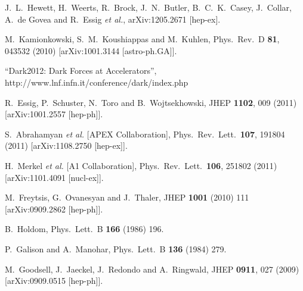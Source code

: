   J.~L.~Hewett, H.~Weerts, R.~Brock, J.~N.~Butler, B.~C.~K.~Casey, J.~Collar, A.~de Govea and R.~Essig {\it et al.}, arXiv:1205.2671 [hep-ex].
  

  M.~Kamionkowski, S.~M.~Koushiappas and M.~Kuhlen,
  Phys.\ Rev.\ D {\bf 81}, 043532 (2010)
  [arXiv:1001.3144 [astro-ph.GA]].

  ``Dark2012: Dark Forces at Accelerators'', http://www.lnf.infn.it/conference/dark/index.php


  R.~Essig, P.~Schuster, N.~Toro and B.~Wojtsekhowski,
  JHEP {\bf 1102}, 009 (2011)
  [arXiv:1001.2557 [hep-ph]].

  S.~Abrahamyan {\it et al.}  [APEX Collaboration],
  Phys.\ Rev.\ Lett.\  {\bf 107}, 191804 (2011)
  [arXiv:1108.2750 [hep-ex]].

  H.~Merkel {\it et al.}  [A1 Collaboration],
  Phys.\ Rev.\ Lett.\  {\bf 106}, 251802 (2011)
  [arXiv:1101.4091 [nucl-ex]].

M.~Freytsis, G.~Ovanesyan and J.~Thaler,
JHEP {\bf 1001} (2010) 111
[arXiv:0909.2862 [hep-ph]].

B.~Holdom,
Phys.\ Lett.\ B {\bf 166} (1986) 196.

P.~Galison and A.~Manohar,
Phys.\ Lett.\ B {\bf 136} (1984) 279.

 M.~Goodsell, J.~Jaeckel, J.~Redondo and A.~Ringwald,
 JHEP {\bf 0911}, 027 (2009)
 [arXiv:0909.0515 [hep-ph]].
 
